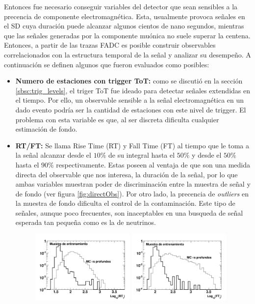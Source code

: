 	Entonces fue necesario conseguir variables del detector que sean sensibles a la precencia de componente electromagnética.
	Esta, usualmente provoca señales en el SD cuya duración puede alcanzar algunos cientos de nano segundos, mientras que las señales generadas por la componente muónica no suele superar la centena.
	Entonces, a partir de las trazas FADC es posible construir observables correlacionados con la estructura temporal de la señal y analizar su desempeño.
	A continuación se definen algunos que fueron evaluados como posibles:
	\begin{itemize}
	 \item \textbf{Numero de estaciones con trigger ToT:} como se discutió en la sección \ref{sbsc:trig_levels}, el triger ToT fue ideado para detectar señales extendidas en el tiempo.
	 Por ello, un observable sensible a la señal electromagnética en un dado evento podría ser la cantidad de estaciones con este nivel de trigger.
	 El problema con esta variable es que, al ser discreta dificulta cualquier estimación de fondo.
	 \item \textbf{RT/FT:} Se llama Rise Time (RT) y Fall Time (FT) al tiempo que le toma a la señal alcanzar desde el $10\%$ de su integral hasta el $50\%$ y desde el $50\%$ hasta el $90\%$ respectivamente.
	 Estas poseen al ventaja de que son una medida directa del observable que nos interesa, la duración de la señal, por lo que ambas variables muestran poder de discriminación entre la muestra de señal y de fondo (ver figura \ref{fig:directObs}).
	 Por otro lado, la precencia de \emph{outliers} en la muestra de fondo dificulta el control de la contaminación.
	 Este tipo de señales, aunque poco frecuentes, son inaceptables en una busqueda de señal esperada tan pequeña como es la de neutrinos.
	 \begin{figure}[ht!]
		\begin{center}
		\includegraphics[width=0.48\textwidth]{fig/seleccionAuger/rt1}
		\hfill
		\includegraphics[width=0.48\textwidth]{fig/seleccionAuger/ft1}

\end{center}
\end{figure}
\end{itemize}
